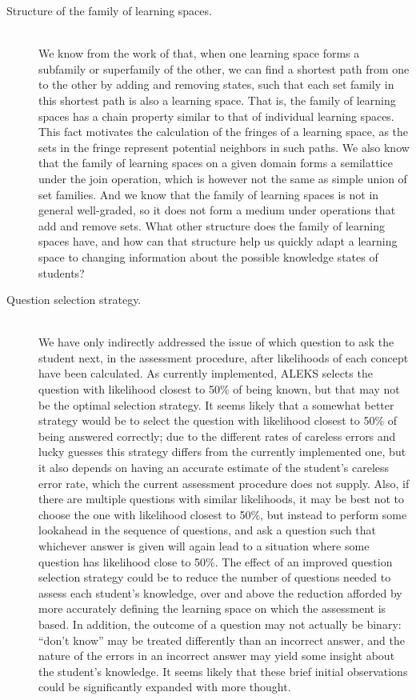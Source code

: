 \documentclass[11pt]{llncs}
\begin{document}
{\begin{description}
\item[Structure of the family of learning spaces.] \hfill\\
We know from the work of \citet{Thi-01} that, when one learning space forms a subfamily or superfamily of the other, we can find a shortest path from one to the other by adding and removing states, such that each set family in this shortest path is also a learning space. That is, the family of learning spaces has a chain property similar to that of individual learning spaces. This fact motivates the calculation of the fringes of a learning space, as the sets in
the fringe represent potential neighbors in such paths. We also know that the family of learning spaces on a given domain forms a semilattice under the join operation, which is however not the same as simple union of set families. And we know that the family of learning spaces is not in general well-graded, so it does not form a medium under operations that add and remove sets. What other structure does the family of learning spaces have, and how can that structure help us quickly adapt a learning space to changing information about the possible knowledge states of students?

\item[Question selection strategy.] \hfill\\
We have only indirectly addressed the issue of which question to ask the student next, in the assessment procedure, after likelihoods of each concept have been calculated.
As currently implemented, ALEKS selects the question with likelihood closest to 50\% of being known, but that may not be the optimal selection strategy. It seems likely that a somewhat better strategy would be to select the question with likelihood closest to 50\% of being answered correctly; due to the different rates of careless errors and lucky guesses this strategy differs from the currently implemented one, but it also depends on having an accurate estimate of the student's careless error rate, which the current assessment procedure does not supply. Also, if there are multiple questions with similar likelihoods, it may be best not to choose the one with likelihood closest to 50\%, but instead to perform some lookahead in the sequence of questions, and ask a question such that whichever answer is given will again lead to a situation where some question has likelihood close to 50\%. The effect of an improved question selection strategy could be to reduce the number of questions needed to assess each student's knowledge, over and above the reduction afforded by more accurately defining the learning space on which the assessment is based. In addition, the outcome of a question may not actually be binary: ``don't know'' may be treated differently than an incorrect answer, and the nature of the errors in an incorrect answer may yield some insight about the student's knowledge. It seems likely that these brief initial observations could be significantly expanded with more thought.
\end{description}

}
\end{document}

